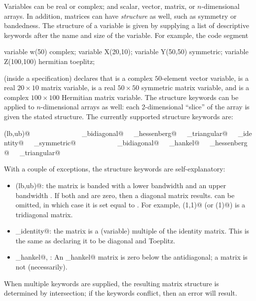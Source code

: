\documentclass[12pt]{article}
\begin{document}
Variables can be real or complex; and scalar, vector,
matrix, or $n$-dimensional arrays. In addition, matrices can have \emph{structure}
as well, such as symmetry or bandedness. The structure of a variable
is given by supplying a list of descriptive keywords after the name
and size of the variable.
For example, the code segment
\begin{code}
	variable w(50) complex;
	variable X(20,10);
	variable Y(50,50) symmetric;
	variable Z(100,100) hermitian toeplitz;
\end{code}
(inside a \cvx specification) declares that \verb@w@ is a complex
$50$-element vector variable, \verb@X@ is
a real $20 \times 10$ matrix variable, \verb@Y@ is
a real $50 \times 50$ symmetric matrix variable,
and \verb@Z@ is a complex $100 \times 100$ Hermitian matrix variable.
The structure keywords can be applied to
$n$-dimensional arrays as well:
each 2-dimensional ``slice'' of the array
is given the stated structure.  The currently supported structure
keywords are:
\begin{center}
\verb@banded(lb,ub)@\ \ \ \verb@complex@\ \ \ \verb@diagonal@\ \ \ \verb@hankel@\ \ \ \verb@hermitian@\ \ \ 
\verb@lower_bidiagonal@\ \ \ \verb@lower_hessenberg@\ \ \ \verb@lower_triangular@\ \ \ \verb@scaled_identity@\ \ \ 
\verb@skew_symmetric@\ \ \ \verb@symmetric@\ \ \ \verb@toeplitz@\ \ \ \verb@tridiagonal@\ \ \ 
\verb@upper_bidiagonal@\ \ \ \verb@upper_hankel@\ \ \ \verb@upper_hessenberg@\ \ \ \verb@upper_triangular@\ \ \ 
\end{center}
With a couple of exceptions, the structure keywords are self-explanatory:
\begin{itemize}
\item \verb@banded(lb,ub)@: the matrix is banded with a lower bandwidth \verb@lb@
and an upper bandwidth \verb@ub@. If both \verb@lb@ and \verb@ub@ are zero, then a 
diagonal matrix results. \verb@ub@ can be omitted, in which case it is set equal to \verb@lb@.
For example, \verb@banded(1,1)@ (or \verb@banded(1)@) is a tridiagonal matrix.
\item \verb@scaled_identity@: the matrix is a (variable) multiple of 
the identity matrix.
This is the same as declaring it to be diagonal and Toeplitz.
\item \verb@upper_hankel@, \verb@hankel@: An \verb@upper_hankel@ matrix is zero below
the antidiagonal; a \verb@hankel@ matrix is not (necessarily).
\end{itemize}
When multiple keywords are supplied, the resulting matrix structure is
determined by intersection; if the keywords conflict, then an error will result.
\end{document}

